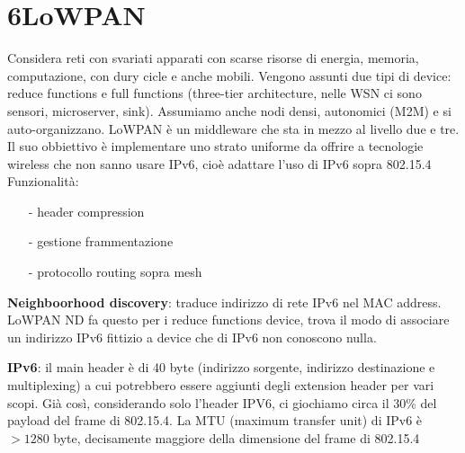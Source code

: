 \documentclass[12pt,italian]{report}
\begin{document}
\section{6LoWPAN}
Considera reti con svariati apparati con scarse risorse di energia, memoria, computazione, con dury cicle e anche mobili. Vengono assunti due tipi di device: reduce functions e full functions (three-tier architecture, nelle WSN ci sono sensori, microserver, sink). Assumiamo anche nodi densi, autonomici (M2M) e si auto-organizzano. 
\bigbreak
LoWPAN è un middleware che sta in mezzo al livello due e tre. Il suo obbiettivo è implementare uno strato uniforme da offrire a tecnologie wireless che non sanno usare IPv6, cioè adattare l'uso di IPv6 sopra 802.15.4
\bigbreak
\noindent Funzionalità:
\begin{itemize}
    \item [-] header compression
    \item [-] gestione frammentazione
    \item [-] protocollo routing sopra mesh
\end{itemize}

\noindent \textbf{Neighboorhood discovery}: traduce indirizzo di rete IPv6 nel MAC address. LoWPAN ND fa questo per i reduce functions device, trova il modo di associare un indirizzo IPv6 fittizio a device che di IPv6 non conoscono nulla. 

\noindent \textbf{IPv6}: il main header è di 40 byte (indirizzo sorgente, indirizzo destinazione e multiplexing) a cui potrebbero essere aggiunti degli extension header per vari scopi. Già così, considerando solo l'header IPV6, ci giochiamo circa il 30\% del payload del frame di 802.15.4. La MTU (maximum transfer unit) di IPv6 è $>1280$ byte, decisamente maggiore della dimensione del frame di 802.15.4
\end{document}
